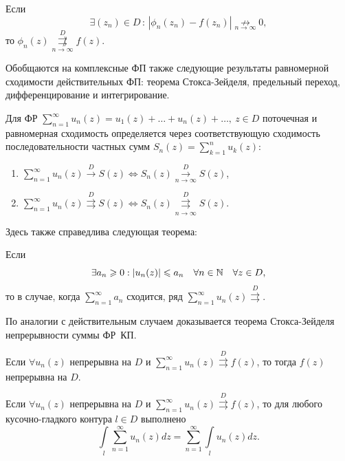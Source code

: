 \documentclass[../../main.tex]{subfiles}
\begin{document}
\begin{thm}
	Если
	\[ \exists (z_n) \in D\, :\, |\phi_n(z_n) - f(z_n)| \underset{n \to 
	\infty}{\not \rightarrow} 0, \]
	то
	$ \phi_n(z) \overset{D}{\underset{n \to \infty}{\not \rightrightarrows}} 
	f(z) $.
\end{thm}

Обобщаются на комплексные ФП также следующие результаты равномерной 
сходимости действительных ФП: теорема Стокса-Зейделя, предельный переход, 
дифференцирование и интегрирование.

Для ФР $ \sum\limits_{n = 1}^{\infty} u_n(z) = u_1(z) + \ldots + u_n(z) + 
\dots,\ z \in D $
поточечная и равномерная сходимость определяется через соответствующую 
сходимость последовательности частных сумм $ S_n(z) = \sum\limits_{k = 1}^{n} 
u_k(z): $

\begin{enumerate}
	\item $ \sum\limits_{n = 1}^{\infty} u_n(z) \overset{D}{\longrightarrow} S(z) 
	\iff S_n(z) \overset{D}{\underset{n \to \infty}\longrightarrow} S(z) $,
	
	\item $ \sum\limits_{n = 1}^{\infty} u_n(z) \overset{D}\rightrightarrows S(z) 
	\iff S_n(z) \overset{D}{\underset{n \to \infty}\rightrightarrows} S(z) $.
\end{enumerate}

Здесь также справедлива следующая теорема:

\begin{thm}
	Если
	\[ \exists a_n \geqslant 0 : |u_n(z)| \leqslant a_n\quad \forall n \in \mathbb{N} \quad \forall z \in D, \]
	то в случае, когда $ \sum\limits_{n = 1}^{\infty} a_n $ сходится, ряд $ 
	\sum\limits_{n = 1}^{\infty} u_n(z) \overset{D}\rightrightarrows $.
\end{thm}

По аналогии с действительным случаем доказывается теорема Стокса-Зейделя 
непрерывности суммы ФР~КП.

\begin{thm}
Если $ \forall u_n (z) $ непрерывна на $ D $ и $ \sum\limits_{n = 
1}^{\infty} u_n(z) \overset{D}\rightrightarrows f(z) $, то тогда $ f(z) $ 
непрерывна на $ D $.
\end{thm}

\begin{thm}
Если $ \forall u_n (z) $ непрерывна на $ D $ и $ \sum\limits_{n = 
1}^{\infty} u_n(z) \overset{D}\rightrightarrows f(z) $, то для любого 
кусочно-гладкого контура $ l \in D $ выполнено
\[ \int\limits_l \sum\limits_{n = 1}^{\infty} u_n(z) dz = \sum\limits_{n = 
1}^{\infty} \int\limits_l  u_n(z) dz. \]
\end{thm}
\end{document}

